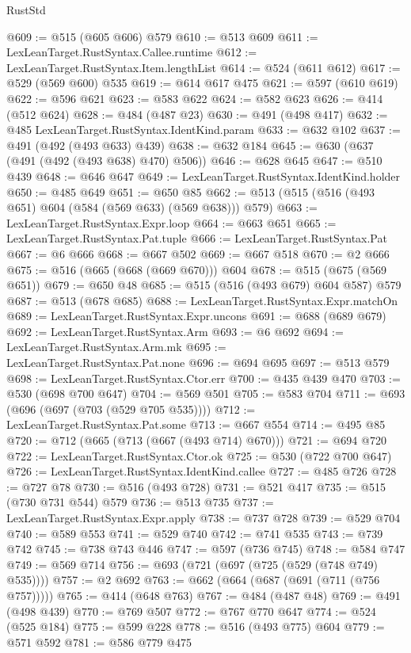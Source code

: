 \begin{lexlean}{RustStd}
\begin{coremodule}
@609 := @515 (@605 @606) @579
@610 := @513 @609
@611 := LexLeanTarget.RustSyntax.Callee.runtime
@612 := LexLeanTarget.RustSyntax.Item.lengthList
@614 := @524 (@611 @612)
@617 := @529 (@569 @600) @535
@619 := @614 @617 @475
@621 := @597 (@610 @619)
@622 := @596 @621
@623 := @583 @622
@624 := @582 @623
@626 := @414 (@512 @624)
@628 := @484 (@487 @23)
@630 := @491 (@498 @417)
@632 := @485 LexLeanTarget.RustSyntax.IdentKind.param
@633 := @632 @102
@637 := @491 (@492 (@493 @633) @439)
@638 := @632 @184
@645 := @630 (@637 (@491 (@492 (@493 @638) @470) @506))
@646 := @628 @645
@647 := @510 @439
@648 := @646 @647
@649 := LexLeanTarget.RustSyntax.IdentKind.holder
@650 := @485 @649
@651 := @650 @85
@662 := @513 (@515 (@516 (@493 @651) @604 (@584 (@569 @633) (@569 @638))) @579)
@663 := LexLeanTarget.RustSyntax.Expr.loop
@664 := @663 @651
@665 := LexLeanTarget.RustSyntax.Pat.tuple
@666 := LexLeanTarget.RustSyntax.Pat
@667 := @6 @666
@668 := @667 @502
@669 := @667 @518
@670 := @2 @666
@675 := @516 (@665 (@668 (@669 @670))) @604
@678 := @515 (@675 (@569 @651))
@679 := @650 @48
@685 := @515 (@516 (@493 @679) @604 @587) @579
@687 := @513 (@678 @685)
@688 := LexLeanTarget.RustSyntax.Expr.matchOn
@689 := LexLeanTarget.RustSyntax.Expr.uncons
@691 := @688 (@689 @679)
@692 := LexLeanTarget.RustSyntax.Arm
@693 := @6 @692
@694 := LexLeanTarget.RustSyntax.Arm.mk
@695 := LexLeanTarget.RustSyntax.Pat.none
@696 := @694 @695
@697 := @513 @579
@698 := LexLeanTarget.RustSyntax.Ctor.err
@700 := @435 @439 @470
@703 := @530 (@698 @700 @647)
@704 := @569 @501
@705 := @583 @704
@711 := @693 (@696 (@697 (@703 (@529 @705 @535))))
@712 := LexLeanTarget.RustSyntax.Pat.some
@713 := @667 @554
@714 := @495 @85
@720 := @712 (@665 (@713 (@667 (@493 @714) @670)))
@721 := @694 @720
@722 := LexLeanTarget.RustSyntax.Ctor.ok
@725 := @530 (@722 @700 @647)
@726 := LexLeanTarget.RustSyntax.IdentKind.callee
@727 := @485 @726
@728 := @727 @78
@730 := @516 (@493 @728)
@731 := @521 @417
@735 := @515 (@730 @731 @544) @579
@736 := @513 @735
@737 := LexLeanTarget.RustSyntax.Expr.apply
@738 := @737 @728
@739 := @529 @704
@740 := @589 @553
@741 := @529 @740
@742 := @741 @535
@743 := @739 @742
@745 := @738 @743 @446
@747 := @597 (@736 @745)
@748 := @584 @747
@749 := @569 @714
@756 := @693 (@721 (@697 (@725 (@529 (@748 @749) @535))))
@757 := @2 @692
@763 := @662 (@664 (@687 (@691 (@711 (@756 @757)))))
@765 := @414 (@648 @763)
@767 := @484 (@487 @48)
@769 := @491 (@498 @439)
@770 := @769 @507
@772 := @767 @770 @647
@774 := @524 (@525 @184)
@775 := @599 @228
@778 := @516 (@493 @775) @604
@779 := @571 @592
@781 := @586 @779 @475

\end{coremodule}
\end{lexlean}
